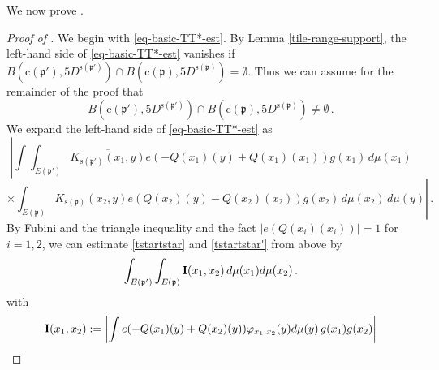 \documentclass[10pt,a4paper]{article}
\theoremstyle{plain}
\theoremstyle{definition}
\numberwithin{equation}{subsection}
\newcommand{\fp}{{\mathfrak p}}
\newcommand{\pc}{{\mathrm{c}}}
\newcommand{\ps}{{\mathrm{s}}}
\newcommand{\tQ}{{Q}}
\newcommand{\proves}[1]{}
\newcommand{\leanok}{}
\begin{document}
We now prove .
\begin{proof}[Proof of ]
    \leanok
    \proves{tile-correlation}
We begin with \eqref{eq-basic-TT*-est}.
By Lemma \ref{tile-range-support}, the left-hand side of \eqref{eq-basic-TT*-est} vanishes if
$B(\pc(\fp'),5D^{\ps(\fp')}) \cap B(\pc(\fp),5D^{\ps(\fp)}) = \emptyset$.
Thus we can assume for the remainder of the proof that
\begin{equation}
        \label{intersec5B}
        B(\pc(\fp'),5D^{\ps(\fp')}) \cap B(\pc(\fp),5D^{\ps(\fp)}) \neq \emptyset\,.
\end{equation}
We expand the left-hand side of \eqref{eq-basic-TT*-est} as
\begin{equation}\label{tstartstar}
\left|\int \int_{E(\fp')} \overline{K_{\ps(\fp')}(x_1,y)}e(-\tQ(x_1)(y)+
    \tQ(x_1)(x_1))g(x_1)\, d\mu(x_1) \right.
\end{equation}
\begin{equation}\label{tstartstar'}
 \times \left.\int_{E(\fp)} {K_{\ps(\fp)}(x_2,y)}e(\tQ(x_2)(y)
    -\tQ(x_2)(x_2))\overline{g(x_2)}\, d\mu(x_2)\, d\mu(y)\right|\, .
\end{equation}
By Fubini and the triangle inequality and
the fact $|e(\tQ(x_i)(x_i))|=1$ for $i=1,2$, we can estimate
\eqref{tstartstar} and \eqref{tstartstar'} from above by
\begin{equation}\label{eqa1}
    \int_{E(\fp')} \int_{E(\fp)} {\bf I}(x_1, x_2)\, d\mu(x_1)d\mu(x_2)\,.
\end{equation}
with
\begin{equation}
    {\bf I}(x_1, x_2):=
    \left|\int
    e(-\tQ(x_1)(y)+\tQ(x_2)(y))\varphi_{x_1,x_2}(y)
    d\mu(y) \, g(x_1)g(x_2)\right|
\end{equation}



\end{proof}
\end{document}
